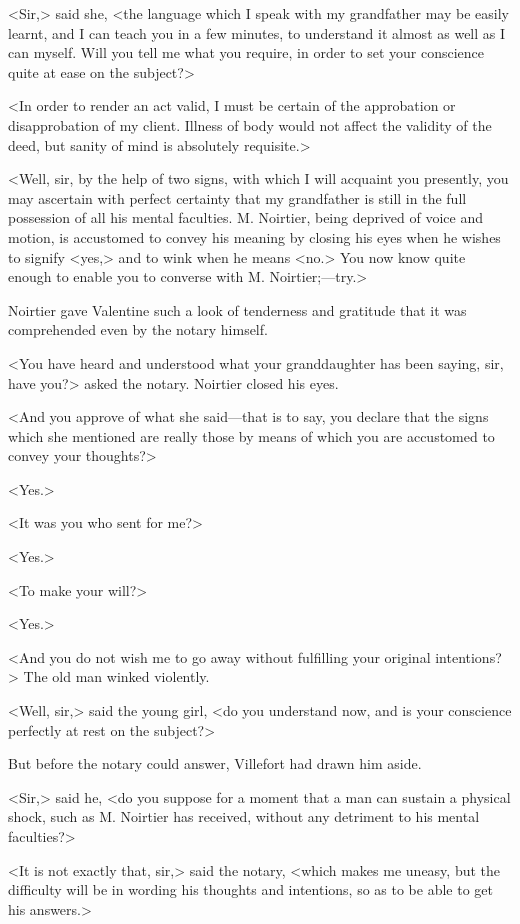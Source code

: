  <Sir,> said she, <the language which I speak with my grandfather may be easily learnt, and I can teach you in a few minutes, to understand it almost as well as I can myself. Will you tell me what you require, in order to set your conscience quite at ease on the subject?> 

 <In order to render an act valid, I must be certain of the approbation or disapprobation of my client. Illness of body would not affect the validity of the deed, but sanity of mind is absolutely requisite.> 

 <Well, sir, by the help of two signs, with which I will acquaint you presently, you may ascertain with perfect certainty that my grandfather is still in the full possession of all his mental faculties. M. Noirtier, being deprived of voice and motion, is accustomed to convey his meaning by closing his eyes when he wishes to signify <yes,> and to wink when he means <no.> You now know quite enough to enable you to converse with M. Noirtier;—try.> 

 Noirtier gave Valentine such a look of tenderness and gratitude that it was comprehended even by the notary himself. 

 <You have heard and understood what your granddaughter has been saying, sir, have you?> asked the notary. Noirtier closed his eyes. 

 <And you approve of what she said—that is to say, you declare that the signs which she mentioned are really those by means of which you are accustomed to convey your thoughts?> 

 <Yes.> 

 <It was you who sent for me?> 

 <Yes.> 

 <To make your will?> 

 <Yes.> 

 <And you do not wish me to go away without fulfilling your original intentions?> The old man winked violently. 

 <Well, sir,> said the young girl, <do you understand now, and is your conscience perfectly at rest on the subject?> 

 But before the notary could answer, Villefort had drawn him aside. 

 <Sir,> said he, <do you suppose for a moment that a man can sustain a physical shock, such as M. Noirtier has received, without any detriment to his mental faculties?> 

 <It is not exactly that, sir,> said the notary, <which makes me uneasy, but the difficulty will be in wording his thoughts and intentions, so as to be able to get his answers.> 

